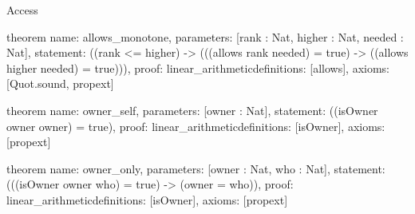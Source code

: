 \begin{lexlean}{Access}
\begin{semanticmodule}
theorem{
  name: allows_monotone,
  parameters: [rank : Nat, higher : Nat, needed : Nat],
  statement: ((rank <= higher) -> (((allows rank needed) = true) -> ((allows higher needed) = true))),
  proof: linear_arithmetic{definitions: [allows]},
  axioms: [Quot.sound, propext]
}

theorem{
  name: owner_self,
  parameters: [owner : Nat],
  statement: ((isOwner owner owner) = true),
  proof: linear_arithmetic{definitions: [isOwner]},
  axioms: [propext]
}

theorem{
  name: owner_only,
  parameters: [owner : Nat, who : Nat],
  statement: (((isOwner owner who) = true) -> (owner = who)),
  proof: linear_arithmetic{definitions: [isOwner]},
  axioms: [propext]
}
\end{semanticmodule}
\end{lexlean}
